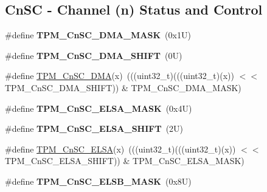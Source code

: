 \subsection*{Cn\+SC -\/ Channel (n) Status and Control}
\begin{DoxyCompactItemize}
\item 
\mbox{\label{group___t_p_m___register___masks_ga22ac77707a11ee299dc16d5a6b738739}} 
\#define {\bfseries T\+P\+M\+\_\+\+Cn\+S\+C\+\_\+\+D\+M\+A\+\_\+\+M\+A\+SK}~(0x1\+U)
\item 
\mbox{\label{group___t_p_m___register___masks_ga368e054056cb1a0c32a9b3493e4c5871}} 
\#define {\bfseries T\+P\+M\+\_\+\+Cn\+S\+C\+\_\+\+D\+M\+A\+\_\+\+S\+H\+I\+FT}~(0\+U)
\item 
\#define \mbox{\hyperlink{group___t_p_m___register___masks_gab93404e2873a4d644f53c02fb5c17f05}{T\+P\+M\+\_\+\+Cn\+S\+C\+\_\+\+D\+MA}}(x)~(((uint32\+\_\+t)(((uint32\+\_\+t)(x)) $<$$<$ T\+P\+M\+\_\+\+Cn\+S\+C\+\_\+\+D\+M\+A\+\_\+\+S\+H\+I\+FT)) \& T\+P\+M\+\_\+\+Cn\+S\+C\+\_\+\+D\+M\+A\+\_\+\+M\+A\+SK)
\item 
\mbox{\label{group___t_p_m___register___masks_ga2e5b9e774ab4f1ad012602f399949dbf}} 
\#define {\bfseries T\+P\+M\+\_\+\+Cn\+S\+C\+\_\+\+E\+L\+S\+A\+\_\+\+M\+A\+SK}~(0x4\+U)
\item 
\mbox{\label{group___t_p_m___register___masks_gae1c6de45c167effd025f7dc8219a0362}} 
\#define {\bfseries T\+P\+M\+\_\+\+Cn\+S\+C\+\_\+\+E\+L\+S\+A\+\_\+\+S\+H\+I\+FT}~(2\+U)
\item 
\#define \mbox{\hyperlink{group___t_p_m___register___masks_gaf54cebb2611b099b10f1e8ab1642aa1f}{T\+P\+M\+\_\+\+Cn\+S\+C\+\_\+\+E\+L\+SA}}(x)~(((uint32\+\_\+t)(((uint32\+\_\+t)(x)) $<$$<$ T\+P\+M\+\_\+\+Cn\+S\+C\+\_\+\+E\+L\+S\+A\+\_\+\+S\+H\+I\+FT)) \& T\+P\+M\+\_\+\+Cn\+S\+C\+\_\+\+E\+L\+S\+A\+\_\+\+M\+A\+SK)
\item 
\mbox{\label{group___t_p_m___register___masks_ga147b60bd08ffe27748d03dfeb6fcc327}} 
\#define {\bfseries T\+P\+M\+\_\+\+Cn\+S\+C\+\_\+\+E\+L\+S\+B\+\_\+\+M\+A\+SK}~(0x8\+U)
\item 
\mbox{\label{group___t_p_m___register___masks_gaa7e82ce01efb5e40ec556ff6c656b995}} 

\end{DoxyCompactItemize}
